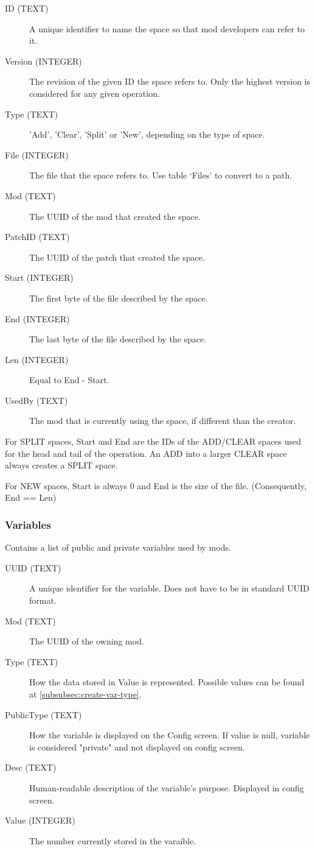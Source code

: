\begin{description}
\item[ID (TEXT)] A unique identifier to name the space so that mod developers can refer to it.
\item[Version (INTEGER)] The revision of the given ID the space refers to. Only the highest version is considered for any given operation.
\item[Type (TEXT)] 'Add', 'Clear', 'Split' or 'New', depending on the type of space.
\item[File (INTEGER)] The file that the space refers to. Use table `Files' to convert to a path.
\item[Mod (TEXT)] The UUID of the mod that created the space.
\item[PatchID (TEXT)] The UUID of the patch that created the space.
\item[Start (INTEGER)] The first byte of the file described by the space.
\item[End (INTEGER)] The last byte of the file described by the space.
\item[Len (INTEGER)] Equal to End - Start.
\item[UsedBy (TEXT)] The mod that is currently using the space, if different than the creator.
\end{description}

For SPLIT spaces, Start and End are the IDs of the ADD/CLEAR spaces used for the head and tail of the operation. An ADD into a larger CLEAR space always creates a SPLIT space.

For NEW spaces, Start is always 0 and End is the size of the file. (Consequently, End == Len)

\subsubsection{Variables}
Contains a list of public and private variables used by mods.

\begin{description}
\item[UUID (TEXT)] A unique identifier for the variable. Does not have to be in standard UUID format.
\item[Mod (TEXT)] The UUID of the owning mod.
\item[Type (TEXT)] How the data stored in Value is represented. Possible values can be found at \ref{subsubsec:create-var-type}.
\item[PublicType (TEXT)] How the variable is displayed on the Config screen. If value is null, variable is considered "private" and not displayed on config screen. 
\item[Desc (TEXT)] Human-readable description of the variable's purpose. Displayed in config screen.	
\item[Value (INTEGER)] The number currently stored in the varaible.

\end{description}

